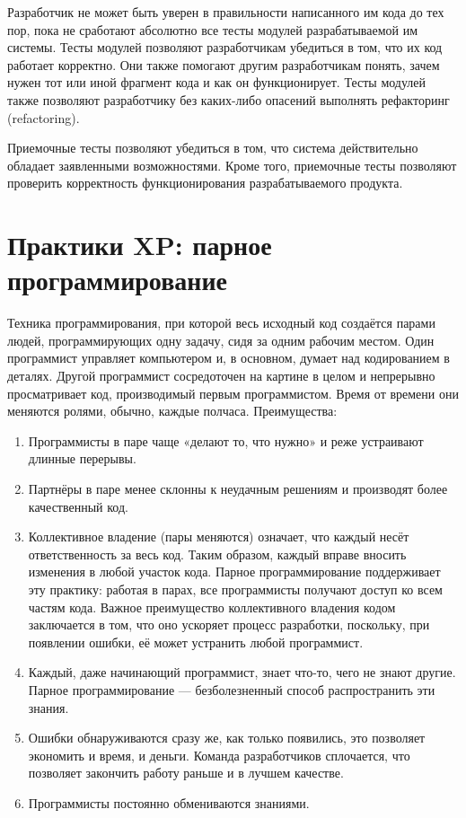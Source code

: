 \documentclass{article}
\begin{document}
    Разработчик не может быть уверен в правильности написанного им кода до тех пор, пока не сработают абсолютно все тесты модулей разрабатываемой им системы. Тесты модулей позволяют разработчикам убедиться в том, что их код работает корректно. Они также помогают другим разработчикам понять, зачем нужен тот или иной фрагмент кода и как он функционирует. Тесты модулей также позволяют разработчику без каких-либо опасений выполнять рефакторинг (refactoring).

    Приемочные тесты позволяют убедиться в том, что система действительно обладает заявленными возможностями. Кроме того, приемочные тесты позволяют проверить корректность функционирования разрабатываемого продукта.

\section{Практики XP: парное программирование}
    Техника программирования, при которой весь исходный код создаётся парами людей, программирующих одну задачу, сидя за одним рабочим местом. Один программист управляет компьютером и, в основном, думает над кодированием в деталях. Другой программист сосредоточен на картине в целом и непрерывно просматривает код, производимый первым программистом. Время от времени они меняются ролями, обычно, каждые полчаса.
    Преимущества:
    \begin{enumerate}
        \item Программисты в паре чаще «делают то, что нужно» и реже устраивают длинные перерывы.
        \item Партнёры в паре менее склонны к неудачным решениям и производят более качественный код.
        \item Коллективное владение (пары меняются) означает, что каждый несёт ответственность за весь код. Таким образом, каждый вправе вносить изменения в любой участок кода. Парное программирование поддерживает эту практику: работая в парах, все программисты получают доступ ко всем частям кода. Важное преимущество коллективного владения кодом заключается в том, что оно ускоряет процесс разработки, поскольку, при появлении ошибки, её может устранить любой программист.
        \item Каждый, даже начинающий программист, знает что-то, чего не знают другие. Парное программирование — безболезненный способ распространить эти знания.
        \item Ошибки обнаруживаются сразу же, как только появились, это позволяет экономить и время, и деньги. Команда разработчиков сплочается, что позволяет закончить работу раньше и в лучшем качестве.
        \item Программисты постоянно обмениваются знаниями.
    \end{enumerate}
\end{document}
